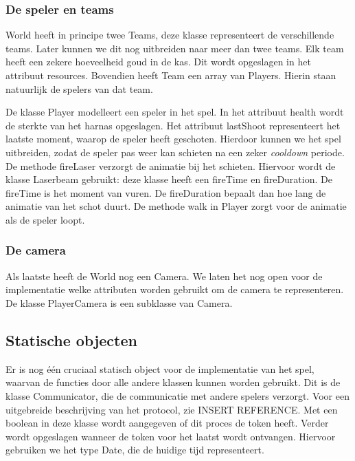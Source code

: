 \subsubsection{De speler en teams}
World heeft in principe twee Teams, deze klasse representeert de verschillende teams. Later kunnen we dit nog uitbreiden naar meer dan twee teams. Elk team heeft een zekere hoeveelheid goud in de kas. Dit wordt opgeslagen in het attribuut resources. Bovendien heeft Team een array van Players. Hierin staan natuurlijk de spelers van dat team.

De klasse Player modelleert een speler in het spel. In het attribuut health wordt de sterkte van het harnas opgeslagen. Het attribuut lastShoot representeert het laatste moment, waarop de speler heeft geschoten. Hierdoor kunnen we het spel uitbreiden, zodat de speler pas weer kan schieten na een zeker \emph{cooldown} periode. De methode fireLaser verzorgt de animatie bij het schieten. Hiervoor wordt de klasse Laserbeam gebruikt: deze klasse heeft een fireTime en fireDuration. De fireTime is het moment van vuren. De fireDuration bepaalt dan hoe lang de animatie van het schot duurt. De methode walk in Player zorgt voor de animatie als de speler loopt.

\subsubsection{De camera}
Als laatste heeft de World nog een Camera. We laten het nog open voor de implementatie welke attributen worden gebruikt om de camera te representeren. De klasse PlayerCamera is een subklasse van Camera.

\subsection{Statische objecten}
Er is nog \'e\'en cruciaal statisch object voor de implementatie van het spel, waarvan de functies door alle andere klassen kunnen worden gebruikt. Dit is de klasse Communicator, die de communicatie met andere spelers verzorgt.  Voor een uitgebreide beschrijving van het protocol, zie INSERT REFERENCE. Met een boolean in deze klasse wordt aangegeven of dit proces de token heeft. Verder wordt opgeslagen wanneer de token voor het laatst wordt ontvangen. Hiervoor gebruiken we het type Date, die de huidige tijd representeert.

